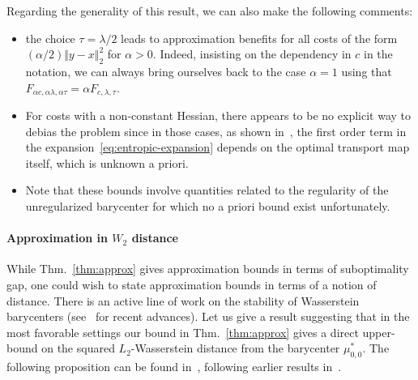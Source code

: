 \documentclass[11pt]{article}
\newcommand{\note}[1]{{\textbf{\color{red}#1}}}
\begin{document}
Regarding the generality of this result, we can also make the following comments:
\begin{itemize}
\item the choice $\tau=\lambda/2$ leads to approximation benefits  for all costs of the form $(\alpha/2)\Vert y-x\Vert_2^2$ for $\alpha>0$. Indeed, insisting on the dependency in $c$ in the notation, we can always bring ourselves back to the case $\alpha=1$ using that $
F_{\alpha c,\alpha \lambda,\alpha \tau} = \alpha F_{c,\lambda,\tau}.
$
\item For costs with a non-constant Hessian, there appears to be no explicit way to debias the problem since in those cases, as shown in~\cite{pal2019difference}, the first order term in the expansion~\eqref{eq:entropic-expansion} depends on the optimal transport map itself, which is unknown a priori.
\item Note that these bounds involve quantities related to the regularity of the unregularized barycenter for which no a priori bound exist unfortunately.
\end{itemize}


\paragraph{Approximation in $W_2$ distance} While Thm.~\ref{thm:approx} gives approximation bounds in terms of suboptimality gap, one could wish to state approximation bounds in terms of a notion of distance. There is an active line of work on the stability of Wasserstein barycenters (see~\cite{carlier2024displacement} for recent advances). Let us give a result suggesting that in the most favorable settings our bound in Thm.~\ref{thm:approx} gives a direct upper-bound on the squared $L_2$-Wasserstein distance from the barycenter $\mu^*_{0,0}$. The following proposition can be found in~\cite[Thm.~6]{chewi2020gradient}, following earlier results in~\cite{ahidar2020convergence}.
\end{document}
